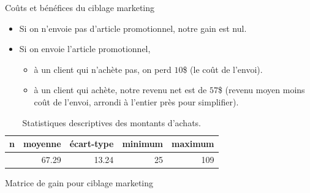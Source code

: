 \documentclass[
  ignorenonframetext,
]{beamer}
\providecommand{\tightlist}{%
  \setlength{\itemsep}{0pt}\setlength{\parskip}{0pt}}\usepackage{longtable,booktabs,array}
\begin{document}
\begin{frame}{Coûts et bénéfices du ciblage marketing}
\label{couxfbts-et-buxe9nuxe9fices-du-ciblage-marketing}
\begin{itemize}
\tightlist
\item
  Si on n'envoie pas d'article promotionnel, notre gain est nul.
\item
  Si on envoie l'article promotionnel,

  \begin{itemize}
  \tightlist
  \item
    à un client qui n'achète pas, on perd \(10\)\$ (le coût de l'envoi).
  \item
    à un client qui achète, notre revenu net est de \(57\)\$ (revenu
    moyen moins coût de l'envoi, arrondi à l'entier près pour
    simplifier).
  \end{itemize}
\end{itemize}

\begin{longtable}[]{@{}rrrrr@{}}

\caption{\label{tbl-dbm-ymontant-apprentissage}Statistiques descriptives
des montants d'achats.}

\tabularnewline

\toprule\noalign{}
n & moyenne & écart-type & minimum & maximum \\
\midrule\noalign{}
\endhead
\bottomrule\noalign{}
\endlastfoot
210 & 67.29 & 13.24 & 25 & 109 \\

\end{longtable}
\end{frame}

\begin{frame}{Matrice de gain pour ciblage marketing}
\label{matrice-de-gain-pour-ciblage-marketing}
\begin{table}

\caption{\label{tbl-tableconfumat5}Matrice de gain pour ciblage
marketing.}


\end{table}%
\end{frame}
\end{document}
